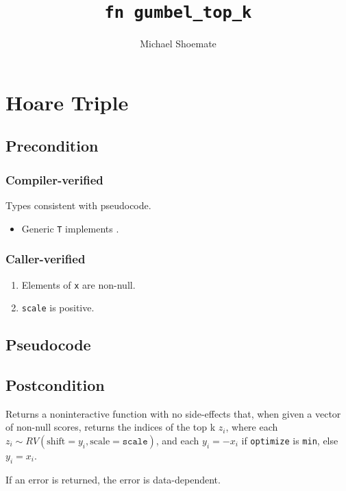 \documentclass{article}
\title{\texttt{fn gumbel\_top\_k}}
\author{Michael Shoemate}
\begin{document}
  
\maketitle 
 
\section{Hoare Triple} 
\subsection*{Precondition} 
\subsubsection*{Compiler-verified}
Types consistent with pseudocode.

\begin{itemize}
    \item Generic \texttt{T} implements .
\end{itemize}

\subsubsection*{Caller-verified}
\begin{enumerate}
    \item Elements of \texttt{x} are non-null.
    \item \texttt{scale} is positive.
\end{enumerate}
 
\subsection*{Pseudocode} 
\label{sec:python-pseudocode} 
 
 
\subsection*{Postcondition} 

\begin{theorem}
    \label{postcondition}
    Returns a noninteractive function with no side-effects that, 
    when given a vector of non-null scores,
    returns the indices of the top k $z_i$,
    where each $z_i \sim RV(\mathrm{shift}=y_i, \mathrm{scale}=\texttt{scale})$,
    and each $y_i = -x_i$ if \texttt{optimize} is \texttt{min}, else $y_i = x_i$.

    If an error is returned, the error is data-dependent.
\end{theorem}
\end{document}
